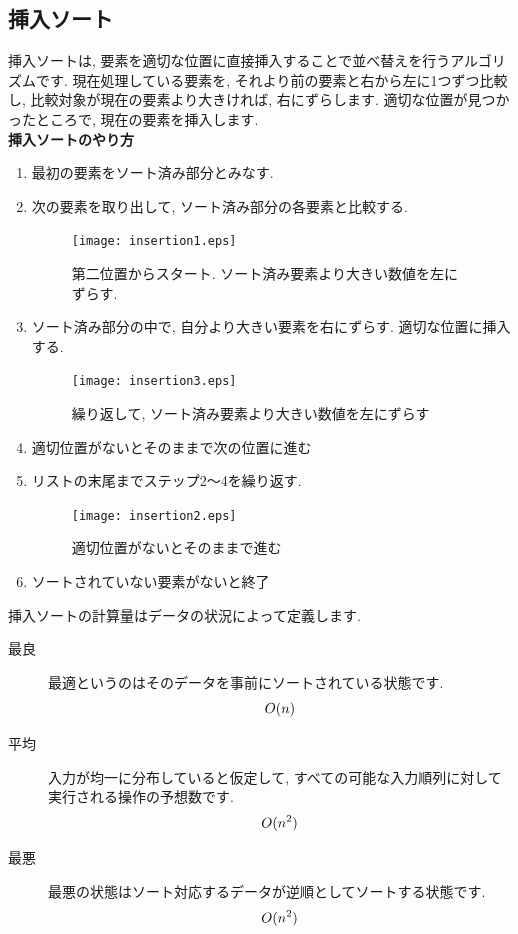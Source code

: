 \documentclass[a4j]{jarticle}
\begin{document}
\subsection{挿入ソート}
挿入ソートは, 要素を適切な位置に直接挿入することで並べ替えを行うアルゴリズムです.   
現在処理している要素を, それより前の要素と右から左に1つずつ比較し, 比較対象が現在の要素より大きければ, 右にずらします.   
適切な位置が見つかったところで, 現在の要素を挿入します. \\
\textbf{挿入ソートのやり方}
\begin{enumerate}
  \item 最初の要素をソート済み部分とみなす. 
  \item 次の要素を取り出して, ソート済み部分の各要素と比較する. 
  \begin{figure}[H]
    \centering
    \texttt{[image: insertion1.eps]}
    \caption{第二位置からスタート. ソート済み要素より大きい数値を左にずらす. }
  \end{figure}
  \item ソート済み部分の中で, 自分より大きい要素を右にずらす. 適切な位置に挿入する. 
  \begin{figure}[H]
  \centering
  \texttt{[image: insertion3.eps]}
    \caption{繰り返して, ソート済み要素より大きい数値を左にずらす}
  \end{figure}
  \item 適切位置がないとそのままで次の位置に進む
  \item リストの末尾までステップ2〜4を繰り返す. 
  \begin{figure}[H]
    \centering
    \texttt{[image: insertion2.eps]}
    \caption{適切位置がないとそのままで進む}
  \end{figure}
  \item ソートされていない要素がないと終了
\end{enumerate}
挿入ソートの計算量はデータの状況によって定義します. 
\begin{description}
  \item[最良] 最適というのはそのデータを事前にソートされている状態です. 
  \begin{equation}
    \centering
    O(n)
  \end{equation}
  \item[平均] 入力が均一に分布していると仮定して, すべての可能な入力順列に対して実行される操作の予想数です. 
  \begin{equation}
    \centering
    O(n^2)
  \end{equation}
  \item[最悪] 最悪の状態はソート対応するデータが逆順としてソートする状態です. 
  \begin{equation}
    \centering
    O(n^2)
  \end{equation}
\end{description}
\end{document}
